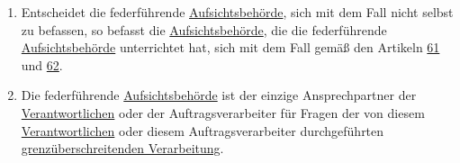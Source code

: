 \begin{enumerate}
  \item Entscheidet die federführende \hyperref[itm:04-21]{Aufsichtsbehörde}, sich mit dem Fall nicht selbst zu befassen, so befasst die
   \hyperref[itm:04-21]{Aufsichtsbehörde}, die die federführende \hyperref[itm:04-21]{Aufsichtsbehörde} unterrichtet hat, sich mit dem Fall gemäß den Artikeln
   \hyperref[ch:61]{61} und \hyperref[ch:62]{62}.
  \label{itm:56-5}

  \item Die federführende \hyperref[itm:04-21]{Aufsichtsbehörde} ist der einzige Ansprechpartner der \hyperref[itm:04-7]{Verantwortlichen} oder der
   Auftragsverarbeiter für Fragen der von diesem \hyperref[itm:04-7]{Verantwortlichen} oder diesem Auftragsverarbeiter durchgeführten
   \hyperref[itm:04-23]{grenzüberschreitenden Verarbeitung}.
  \label{itm:56-6}

\end{enumerate}


